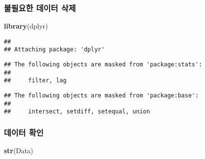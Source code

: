 \documentclass[]{article}
\newenvironment{Shaded}{\begin{snugshade}}{\end{snugshade}}
\newcommand{\KeywordTok}[1]{\textcolor[rgb]{0.13,0.29,0.53}{\textbf{#1}}}
\newcommand{\DecValTok}[1]{\textcolor[rgb]{0.00,0.00,0.81}{#1}}
\newcommand{\StringTok}[1]{\textcolor[rgb]{0.31,0.60,0.02}{#1}}
\newcommand{\OperatorTok}[1]{\textcolor[rgb]{0.81,0.36,0.00}{\textbf{#1}}}
\newcommand{\NormalTok}[1]{#1}
\begin{document}
\subsubsection{불필요한 데이터 삭제}\label{--}

\begin{Shaded}
\begin{Highlighting}[]
\KeywordTok{library}\NormalTok{(dplyr)}
\end{Highlighting}
\end{Shaded}

\begin{verbatim}
## 
## Attaching package: 'dplyr'
\end{verbatim}

\begin{verbatim}
## The following objects are masked from 'package:stats':
## 
##     filter, lag
\end{verbatim}

\begin{verbatim}
## The following objects are masked from 'package:base':
## 
##     intersect, setdiff, setequal, union
\end{verbatim}

\begin{Shaded}
\end{Shaded}

\subsubsection{데이터 확인}\label{-}

\begin{Shaded}
\begin{Highlighting}[]
\KeywordTok{str}\NormalTok{(Data)}
\end{Highlighting}
\end{Shaded}
\end{document}
